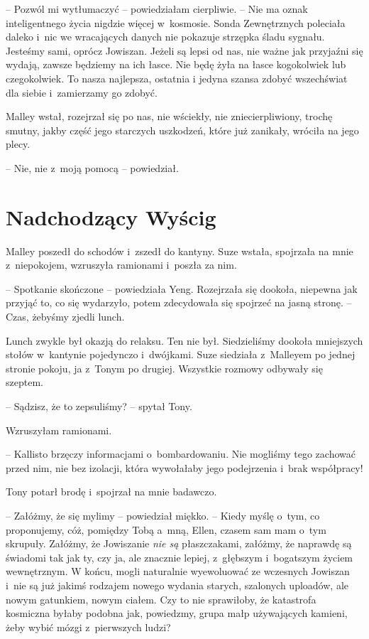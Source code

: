 \documentclass[oneside,polish,11pt,sfheadings]{mwbk}
\begin{document}
-- Pozwól mi wytłumaczyć -- powiedziałam cierpliwie. -- Nie ma oznak
inteligentnego życia nigdzie więcej w~kosmosie. Sonda Zewnętrznych
poleciała daleko i~nic we wracających danych nie pokazuje strzępka śladu
sygnału. Jesteśmy sami, oprócz Jowiszan. Jeżeli są lepsi od nas, nie
ważne jak przyjaźni się wydają, zawsze będziemy na ich łasce. Nie będę
żyła na łasce kogokolwiek lub czegokolwiek. To nasza najlepsza, ostatnia
i jedyna szansa zdobyć wszechświat dla siebie i~zamierzamy go zdobyć.

Malley wstał, rozejrzał się po nas, nie wściekły, nie zniecierpliwiony,
trochę smutny, jakby część jego starczych uszkodzeń, które już zanikały,
wróciła na jego plecy.

-- Nie, nie z~moją pomocą -- powiedział.

\chapter{Nadchodzący Wyścig}

Malley poszedł do schodów i~zszedł do kantyny. Suze wstała, spojrzała na
mnie z~niepokojem, wzruszyła ramionami i~poszła za nim.

-- Spotkanie skończone -- powiedziała Yeng. Rozejrzała się dookoła,
niepewna jak przyjąć to, co się wydarzyło, potem zdecydowała się
spojrzeć na jasną stronę. -- Czas, żebyśmy zjedli lunch.

Lunch zwykle był okazją do relaksu. Ten nie był. Siedzieliśmy dookoła
mniejszych stołów w~kantynie pojedynczo i~dwójkami. Suze siedziała z~Malleyem po jednej stronie pokoju, ja z~Tonym po drugiej. Wszystkie
rozmowy odbywały się szeptem.

-- Sądzisz, że to zepsuliśmy? -- spytał Tony.

Wzruszyłam ramionami. 

-- Kallisto brzęczy informacjami o~bombardowaniu.
Nie mogliśmy tego zachować przed nim, nie bez izolacji, która wywołałaby
jego podejrzenia i~brak współpracy!

Tony potarł brodę i~spojrzał na mnie badawczo. 

-- Załóżmy, że się mylimy
-- powiedział miękko. -- Kiedy myślę o~tym, co proponujemy, cóż, pomiędzy
Tobą a~mną, Ellen, czasem sam mam o~tym skrupuły. Załóżmy, że Jowiszanie
\textit{nie są} płaszczakami, załóżmy, że naprawdę są świadomi tak jak ty,
czy ja, ale znacznie lepiej, z~głębszym i~bogatszym życiem wewnętrznym.
W końcu, mogli naturalnie wyewoluować ze wczesnych Jowiszan i~nie są już
jakimś rodzajem nowego wydania starych, szalonych uploadów, ale nowym
gatunkiem, nowym ciałem. Czy to nie sprawiłoby, że katastrofa kosmiczna
byłaby podobna jak, powiedzmy, grupa małp używających kamieni, żeby
wybić mózgi z~pierwszych ludzi?
\end{document}
